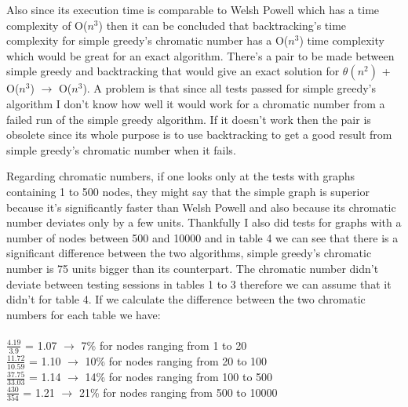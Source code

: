\documentclass[runningheads]{llncs}
\begin{document}
Also since
its execution time is comparable to Welsh Powell which has a time complexity of O($n^3$) then
it can be concluded that backtracking's time complexity for simple greedy's chromatic number
has a O($n^3$) time complexity which would be great for an exact algorithm. 
There's a pair to be made between simple greedy and backtracking that would give an exact solution for $\theta(n^2)$
+ O($n^3$) $\rightarrow$ O($n^3$). A problem is that since all tests passed for simple greedy's
algorithm I don't know how well it would work for a chromatic number from a failed run of
the simple greedy algorithm. If it doesn't work then the pair is obsolete since its whole purpose
is to use backtracking to get a good result from simple greedy's chromatic number
when it fails.

Regarding chromatic numbers, if one looks only at the tests with graphs containing 1 to 500 nodes, they might say that
the simple graph is superior because it's significantly faster than Welsh Powell and also because
its chromatic number deviates only by a few units. Thankfully I also did tests for graphs
with a number of nodes between 500 and 10000 and in table 4 we can see that there is a significant
difference between the two algorithms, simple greedy's chromatic number is
75 units bigger than its counterpart. The chromatic number didn't deviate between testing sessions
in tables 1 to 3 therefore we can assume that it didn't for table 4.
If we calculate the difference between the two chromatic numbers for each table we have:
\\
\\
\vspace{3pt}
\textbullet \hspace{1pt} $\frac{4.19}{3.9}$ = 1.07 $\rightarrow$ 7\% for nodes ranging from 1 to 20 \\
\vspace{3pt}
\textbullet \hspace{1pt} $\frac{11.72}{10.59}$ = 1.10 $\rightarrow$ 10\% for nodes ranging from 20 to 100 \\
\vspace{3pt}
\textbullet \hspace{1pt} $\frac{37.75}{33.03}$ = 1.14 $\rightarrow$ 14\% for nodes ranging from 100 to 500 \\
\vspace{3pt}
\textbullet \hspace{1pt} $\frac{430}{354}$ = 1.21 $\rightarrow$ 21\% for nodes ranging from 500 to 10000 \\
\end{document}
